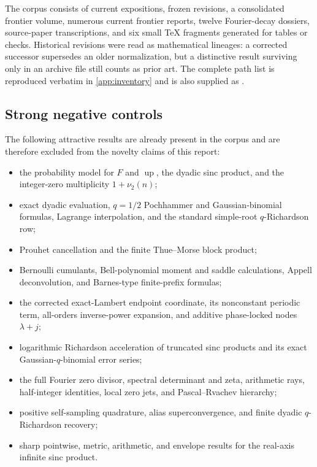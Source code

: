 \documentclass[11pt,oneside]{article}
\numberwithin{equation}{section}
\theoremstyle{definition}
\theoremstyle{remark}
\newcommand{\Up}{\operatorname{up}}
\newcommand{\vtwo}{\nu_2}
\begin{document}
The corpus consists of current expositions, frozen revisions, a consolidated frontier
volume, numerous current frontier reports, twelve Fourier-decay dossiers, source-paper
transcriptions, and six small TeX fragments generated for tables or checks.  Historical
revisions were read as mathematical lineages: a corrected successor supersedes an older
normalization, but a distinctive result surviving only in an archive file still counts as
prior art.  The complete path list is reproduced verbatim in \cref{app:inventory} and is
also supplied as  \cite{proveit}.

\subsection{Strong negative controls}

The following attractive results are already present in the corpus and are therefore
excluded from the novelty claims of this report:
\begin{itemize}
\item the probability model for $F$ and $\Up$, the dyadic sinc product, and the integer-zero
      multiplicity $1+\vtwo(n)$;
\item exact dyadic evaluation, $q=1/2$ Pochhammer and Gaussian-binomial formulas, Lagrange
      interpolation, and the standard simple-root $q$-Richardson row;
\item Prouhet cancellation and the finite Thue--Morse block product;
\item Bernoulli cumulants, Bell-polynomial moment and saddle calculations, Appell
      deconvolution, and Barnes-type finite-prefix formulas;
\item the corrected exact-Lambert endpoint coordinate, its nonconstant periodic term,
      all-orders inverse-power expansion, and additive phase-locked nodes $\lambda+j$;
\item logarithmic Richardson acceleration of truncated sinc products and its exact
      Gaussian-$q$-binomial error series;
\item the full Fourier zero divisor, spectral determinant and zeta, arithmetic rays,
      half-integer identities, local zero jets, and Pascal--Rvachev hierarchy;
\item positive self-sampling quadrature, alias superconvergence, and finite dyadic
      $q$-Richardson recovery;
\item sharp pointwise, metric, arithmetic, and envelope results for the real-axis infinite
      sinc product.
\end{itemize}
\end{document}
